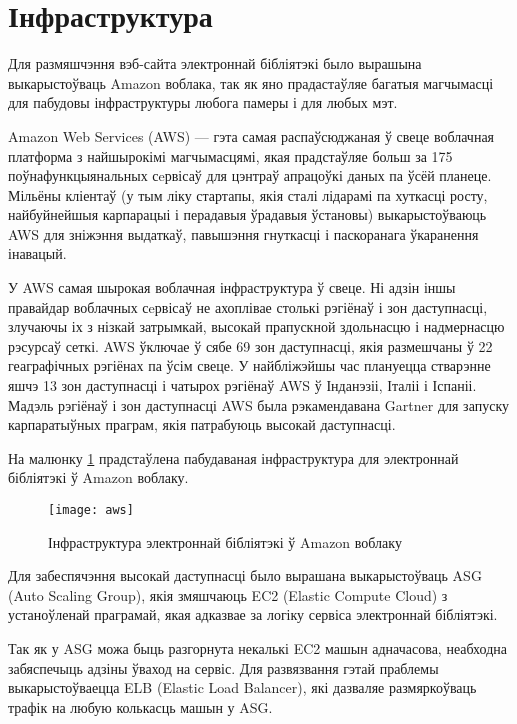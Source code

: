 \section{Інфраструктура}

Для размяшчэння вэб-сайта электроннай бібліятэкі было вырашына выкарыстоўваць Amazon воблака, так як
яно прадастаўляе багатыя магчымасці для пабудовы інфраструктуры любога памеры і для любых мэт.

Amazon Web Services (AWS) --- гэта самая распаўсюджаная ў свеце воблачная платформа з найшырокімі магчымасцямі, якая прадстаўляе больш за 175 поўнафункцыянальных сeрвісаў для цэнтраў апрацоўкі даных па ўсёй планеце. Мільёны кліентаў (у тым ліку стартапы, якія сталі лідарамі па хуткасці росту, найбуйнейшыя карпарацыі і перадавыя ўрадавыя ўстановы) выкарыстоўваюць AWS для зніжэння выдаткаў, павышэння гнуткасці і паскоранага ўкаранення інавацый.

У AWS самая шырокая воблачная інфраструктура ў свеце. Ні адзін іншы правайдар воблачных сeрвісаў не ахоплівае столькі рэгіёнаў і зон даступнасці, злучаючы іх з нізкай затрымкай, высокай прапускной здольнасцю і надмернасцю рэсурсаў сеткі. AWS ўключае ў сябе 69 зон даступнасці, якія размешчаны ў 22 геаграфічных рэгіёнах па ўсім свеце. У найбліжэйшы час плануецца стварэнне яшчэ 13 зон даступнасці і чатырох рэгіёнаў AWS ў Інданэзіі, Італіі і Іспаніі. Мадэль рэгіёнаў і зон даступнасці AWS была рэкамендавана Gartner для запуску карпаратыўных праграм, якія патрабуюць высокай даступнасці.

На малюнку \ref{img: aws infra} прадстаўлена пабудаваная інфраструктура
для электроннай бібліятэкі ў Amazon воблаку.

\begin{figure}[h!]
    \centering
    \texttt{[image: aws]}
    \caption{Інфраструктура электроннай бібліятэкі ў Amazon воблаку}
    \label{img: aws infra} 
\end{figure}

Для забеспячэння высокай даступнасці было вырашана выкарыстоўваць ASG (Auto Sca\-ling Group),
якія змяшчаюць EC2 (Elastic Compute Cloud) з устаноўленай праграмай, якая адказвае за логіку
сервіса электроннай бібліятэкі.

Так як у ASG можа быць разгорнута некалькі EC2 машын адначасова, неабходна забяспечыць адзіны
ўваход на сервіс. Для развязвання гэтай праблемы выкарыстоўваецца ELB (Elastic Load Balancer),
які дазваляе размяркоўваць трафік на любую колькасць машын у ASG.

